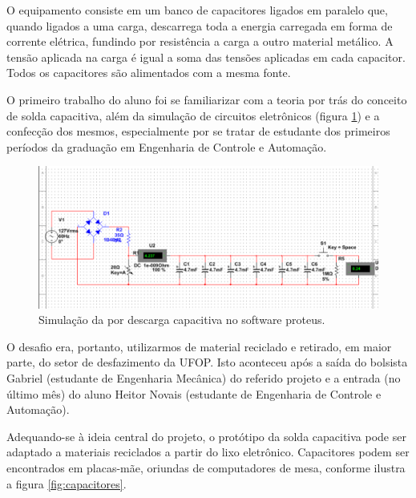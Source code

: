\documentclass[
	12pt,				%
	openright,			%
	oneside,			%
	a4paper,			%
	english,			%
	spanish,			%
	brazil,				%
	]{abntex2}
\begin{document}
O equipamento consiste em um banco de capacitores ligados em paralelo que, quando ligados a uma carga, descarrega toda a energia carregada em forma de corrente elétrica, fundindo por resistência a carga a outro material metálico. A tensão aplicada na carga é igual a soma das tensões aplicadas em cada capacitor. Todos os capacitores são alimentados com a mesma fonte.

O primeiro trabalho do aluno foi se familiarizar com a teoria por trás do conceito de solda capacitiva, além da simulação de circuitos eletrônicos (figura \ref{fig:simulacao1}) e a confecção dos mesmos, especialmente por se tratar de estudante dos primeiros períodos da graduação em Engenharia de Controle e Automação.

\begin{figure}[H]
	\centering
	\includegraphics[scale=0.7]{figuras/simulacao1.pdf}
	\caption{Simulação da por descarga capacitiva no software proteus.}  \label{fig:simulacao1} 
\end{figure}

O desafio era, portanto, utilizarmos de material reciclado e retirado, em maior parte, do setor de desfazimento da UFOP. Isto aconteceu após a saída do bolsista Gabriel (estudante de Engenharia Mecânica) do referido projeto e a entrada (no último mês) do aluno Heitor Novais (estudante de Engenharia de Controle e Automação). 

Adequando-se à ideia central do projeto, o protótipo da solda capacitiva pode ser adaptado a materiais reciclados a partir do lixo eletrônico.
Capacitores podem ser encontrados em placas-mãe, oriundas de computadores de mesa, conforme ilustra a figura \ref{fig:capacitores}.
\end{document}
